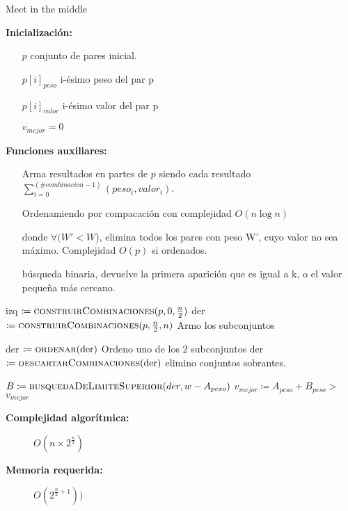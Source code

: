 \documentclass[fleqn, 11pt]{article}
\def\is{\coloneqq}
\begin{document}
\begin{algorithm}
\caption{Meet in the middle}
\begin{algorithmic}[1]
\item[\textbf{Inicialización:}]
\item[] \begin{itemize}
	\item[] $p$ conjunto de pares inicial.
	\item[] $p[i]_{peso}$ i-ésimo peso del par p
	\item[] $p[i]_{valor}$ i-ésimo valor del par p
	\item[] $v_{mejor} = 0$
\end{itemize}
\item[\textbf{Funciones auxiliares:}]
\item[] \begin{itemize}
	\setlength\itemsep{1em}
	\item[]  Arma resultados en partes de $p$ siendo cada resultado $\sum_{i = 0}^{(\#combinacion -1)} (peso_i, valor_i)$. 
	
	\item[]  Ordenamiendo por compacación con
	complejidad $O(n\log n)$
	
	\item[]  donde $\forall (W' < W$), elimina todos los pares con peso W', cuyo valor no sea máximo. Complejidad $O(p)$ si ordenados. 

	\item[]  búsqueda binaria, devuelve la primera aparición que es igual a k, o el valor pequeña más cercano.
\end{itemize}
\Statex
{}
\State izq $\is \Call{construirCombinaciones}{p, 0, \frac{n}{2}}$
\State der $\is \Call{construirCombinaciones}{p, \frac{n}{2}, n}$
\Comment Armo los subconjuntos

\State der $\is \Call{ordenar}{\text{der}}$
\Comment Ordeno uno de los 2 subconjuntos
\State der $\is \Call{descartarCombinaciones}{\text{der}}$
\Comment elimino conjuntos sobrantes.

	\State $B \is \Call{busquedaDeLimiteSuperior}{der, w - A_{peso}}$
			\State  $v_{mejor} \is A_{peso} + B_{peso} > $
		\EndIf
	\EndIf
\EndFor
\State \Return $v_{mejor}$
\EndFunction
\end{algorithmic}
\begin{description}
	\item[\textbf{Complejidad algorítmica:}] $O(n \times 2^{\frac{n}{2}})$
	\item[\textbf{Memoria requerida:}] $O(2^{\frac{n}{2}+1}))$
\end{description}
\end{algorithm}
\end{document}

